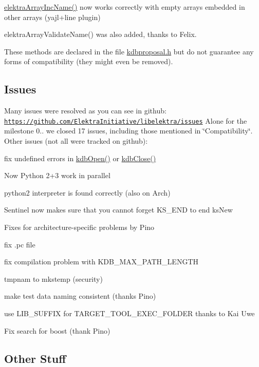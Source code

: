 \hyperlink{array_8c_afc46476b8d722d89e07a966e023df317}{elektra\+Array\+Inc\+Name()} now works correctly with empty arrays embedded in other arrays (yajl+line plugin)

elektra\+Array\+Validate\+Name() was also added, thanks to Felix.

These methods are declared in the file \hyperlink{kdbproposal_8h}{kdbproposal.\+h} but do not guarantee any forms of compatibility (they might even be removed).

\subsection*{Issues}

Many issues were resolved as you can see in github\+: \href{https://github.com/ElektraInitiative/libelektra/issues}{\tt https\+://github.\+com/\+Elektra\+Initiative/libelektra/issues} Alone for the milestone 0.. we closed 17 issues, including those mentioned in \char`\"{}\+Compatibility\char`\"{}. Other issues (not all were tracked on github)\+:


\begin{DoxyItemize}
\item fix undefined errors in \hyperlink{group__kdb_ga6808defe5870f328dd17910aacbdc6ca}{kdb\+Open()} or \hyperlink{group__kdb_gadb54dc9fda17ee07deb9444df745c96f}{kdb\+Close()}
\item Now Python 2+3 work in parallel
\item python2 interpreter is found correctly (also on Arch)
\item Sentinel now makes sure that you cannot forget K\+S\+\_\+\+E\+ND to end ks\+New
\item Fixes for architecture-\/specific problems by Pino
\item fix .pc file
\item fix compilation problem with K\+D\+B\+\_\+\+M\+A\+X\+\_\+\+P\+A\+T\+H\+\_\+\+L\+E\+N\+G\+TH
\item tmpnam to mkstemp (security)
\item make test data naming consistent (thanks Pino)
\item use L\+I\+B\+\_\+\+S\+U\+F\+F\+IX for T\+A\+R\+G\+E\+T\+\_\+\+T\+O\+O\+L\+\_\+\+E\+X\+E\+C\+\_\+\+F\+O\+L\+D\+ER thanks to Kai Uwe
\item Fix search for boost (thank Pino)
\end{DoxyItemize}

\subsection*{Other Stuff}


